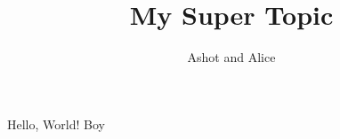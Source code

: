 \documentclass[utf8]{beamer}
\title{My Super Topic}
\author{Ashot and Alice}
\begin{document}

\begin{frame}%
\titlepage
\end{frame}

\begin{frame}%
Hello, World!
Boy
\end{frame}
\end{document}
